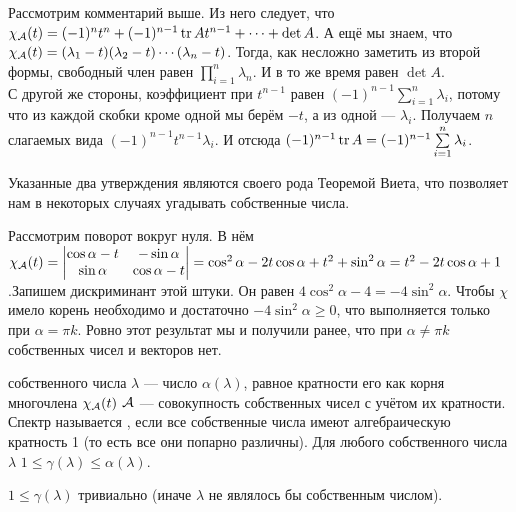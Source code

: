 \documentclass{article}
\begin{document}
\begin{itemize}
        \begin{Proof}
            Рассмотрим комментарий выше. Из него следует, что $\chi_{\mathcal{A}}(t)=(-1)^nt^n+(-1)^{n-1}\operatorname{tr} At^{n-1}+\cdots+\det A$. А ещё мы знаем, что $\chi_{\mathcal{A}}(t)=(\lambda_1-t)(\lambda_2-t)\cdots(\lambda_n-t)$. Тогда, как несложно заметить из второй формы, свободный член равен $\prod\limits_{i=1}^n\lambda_n$. И в то же время равен $\det A$.\\
            С другой же стороны, коэффициент при $t^{n-1}$ равен $(-1)^{n-1}\sum\limits_{i=1}^n\lambda_i$, потому что из каждой скобки кроме одной мы берём $-t$, а из одной --- $\lambda_i$. Получаем $n$ слагаемых вида $(-1)^{n-1}t^{n-1}\lambda_i$. И отсюда $(-1)^{n-1}\operatorname{tr} A=(-1)^{n-1}\sum\limits_{i=1}^n\lambda_i$.
        \end{Proof}
        \begin{Comment}
            Указанные два утверждения являются своего рода Теоремой Виета, что позволяет нам в некоторых случаях угадывать собственные числа.
        \end{Comment}
        \begin{Example}
            Рассмотрим поворот вокруг нуля. В нём $\chi_{\mathcal{A}}(t)=\left|\begin{matrix}
                \cos\alpha-t & -\sin\alpha\\
                \sin\alpha & \cos\alpha-t
            \end{matrix}\right|=\cos^2\alpha-2t\cos\alpha+t^2+\sin^2\alpha=t^2-2t\cos\alpha+1$.Запишем дискриминант этой штуки. Он равен $4\cos^2\alpha-4=-4\sin^2\alpha$. Чтобы $\chi$ имело корень необходимо и достаточно $-4\sin^2\alpha\geqslant0$, что выполняется только при $\alpha=\pi k$. Ровно этот результат мы и получили ранее, что при $\alpha\neq\pi k$ собственных чисел и векторов нет.
        \end{Example}
        \dfn {} собственного числа $\lambda$ --- число $\alpha(\lambda)$, равное кратности его как корня многочлена $\chi_{\mathcal{A}}(t)$
        \dfn {} ${\mathcal{A}}$ --- совокупность собственных чисел с учётом их кратности.
        \dfn Спектр называется , если все собственные числа имеют алгебраическую кратность 1 (то есть все они попарно различны).
        \thm Для любого собственного числа $\lambda$ $1\leqslant\gamma(\lambda)\leqslant\alpha(\lambda)$.
        \begin{Proof}
            $1\leqslant\gamma(\lambda)$ тривиально (иначе $\lambda$ не являлось бы собственным числом).\\

\end{Proof}
\end{itemize}
\end{document}
